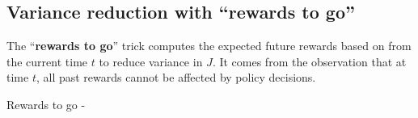 \documentclass{article}
\begin{document}
\subsection{Variance reduction with ``rewards to go''}

The ``\textbf{rewards to go}'' trick computes the expected future rewards 
based on from the current time $t$ to reduce variance in $J$. It comes from the 
observation that at time $t$, all past rewards cannot be affected by policy decisions.

Rewards to go - 

\small


\end{document}
